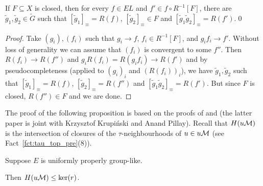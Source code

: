 	
	\begin{prop}
		\label{prop:approx2}
		If $F\subseteq X$ is closed, then for every $f\in EL$ and $f'\in f\circ R^{-1}[F]$, there are $\tilde g_1,\tilde g_2\in \tilde G$ such that $[\tilde g_1]_\equiv=R(f)$, $[\tilde g_2]_\equiv\in F$ and $[\tilde g_1\tilde g_2]_\equiv=R(f')$.\qed
	\end{prop}
	\begin{proof}
		Take $(g_i), (f_i)$ such that $g_i\to f$, $f_i\in R^{-1}[F]$, and $g_if_i\to f'$. Without loss of generality we can assume that $(f_i)$ is convergent to some $f''$. Then $R(f_i)\to R(f'')$ and $g_iR(f_i)=R(g_if_i)\to R(f')$ and by pseudocompleteness (applied to $(g_i)_i$ and $(R(f_i))_i$), we have $\tilde g_1,\tilde g_2$ such that $[\tilde g_1]_\equiv=R(f)$, $[\tilde g_2]_\equiv=R(f'')$ and $[\tilde g_1\tilde g_2]_\equiv=R(f')$. But since $F$ is closed, $R(f'')\in F$ and we are done.
	\end{proof}
	The proof of the following proposition is based on the proofs of \cite[Theorem 0.1]{KP17} and \cite[Theorem 2.7]{KPR15} (the latter paper is joint with Krzysztof Krupiński and Anand Pillay). Recall that $H(u{\mathcal M})$ is the intersection of closures of the $\tau$-neighbourhoods of $u\in u{\mathcal M}$  (see Fact~\ref{fct:tau_top_pre}(8)).
	\begin{prop}
		\label{prop:H(uM)_in_ker}
		Suppose $E$ is uniformly properly group-like.
		
		Then $H(u{\mathcal M})\leq \ker(r)$.
	\end{prop}
